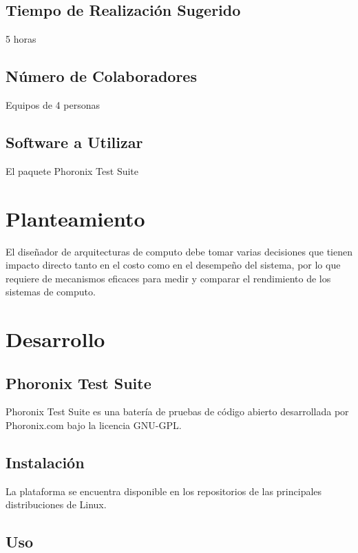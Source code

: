 \documentclass{article}
\begin{document}
\subsection{Tiempo de Realización Sugerido}

5 horas

\subsection{Número de Colaboradores}

Equipos de 4 personas

\subsection{Software a Utilizar}

El paquete Phoronix Test Suite

\section{Planteamiento}

El diseñador de arquitecturas de computo debe tomar varias decisiones que tienen impacto directo tanto en el costo como en el desempeño del sistema, por lo que requiere de mecanismos eficaces para medir y comparar el rendimiento de los sistemas de computo.

\section{Desarrollo}

\subsection{Phoronix Test Suite}

Phoronix Test Suite es una batería de pruebas de código abierto desarrollada por Phoronix.com bajo la licencia GNU-GPL.

\subsection{Instalación}

La plataforma se encuentra disponible en los repositorios de las principales distribuciones de Linux.

\subsection{Uso}
\end{document}
